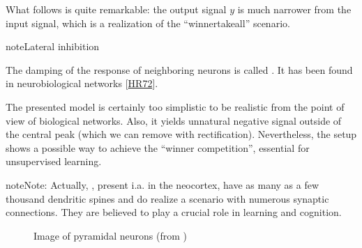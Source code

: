 \documentclass[letterpaper,10pt,english]{jupyterBook}
\let\sphinxpxdimen\pdfpxdimen\else\newdimen\sphinxpxdimen
\begin{document}
\begin{sphinxVerbatim}[commandchars=\\\{\}]
 
                      
\PYG{p}{[}\PYG{p}{]}                             
\end{sphinxVerbatim}

\sphinxAtStartPar
What follows is quite remarkable: the output signal \(y\) is much narrower from the input signal, which is a realization of the “winner\sphinxhyphen{}take\sphinxhyphen{}all” scenario.

\noindent{}

\begin{sphinxadmonition}{note}{Lateral inhibition}

\sphinxAtStartPar
The damping of the response of neighboring neurons is called . It has been found in neurobiological networks {[}\hyperlink{cite.docs/conclusion:id14}{HR72}{]}.
\end{sphinxadmonition}

\sphinxAtStartPar
The presented model is certainly too simplistic to be realistic from the point of view of biological networks. Also, it yields unnatural negative signal outside of the central peak (which we can remove with rectification). Nevertheless, the setup shows a possible way to achieve the “winner competition”, essential for unsupervised learning.

\begin{sphinxadmonition}{note}{Note:}
\sphinxAtStartPar
Actually, , present i.a. in the neocortex, have as many as a few thousand dendritic spines and do realize a scenario with numerous synaptic connections. They are believed  to play a crucial role in learning and cognition.
\end{sphinxadmonition}

\begin{figure}[htbp]
\centering
\capstart

\noindent\sphinxincludegraphics[width=300\sphinxpxdimen]{{smi32-pic}.jpg}
\caption{Image of pyramidal neurons (from )}\label{\detokenize{docs/som:pyr-fig}}\end{figure}
\end{document}
